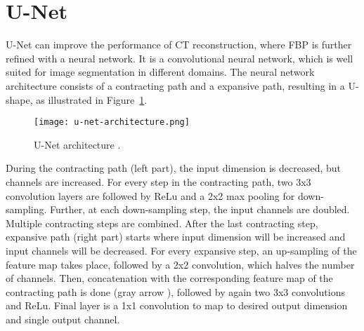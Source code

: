 \section{U-Net}
\label{sec:unet}
U-Net can improve the performance of CT reconstruction, where FBP is further refined with a neural network.
It is a convolutional neural network, which is well suited for image segmentation in different domains.
The neural network architecture consists of a contracting path and a expansive path,
resulting in a U-shape, as illustrated in Figure~\ref{fig:u-net-architectue}.

\begin{figure}[H]
  \centering
  \texttt{[image: u-net-architecture.png]}
  \caption{U-Net architecture \cite[p 2, Fig. 1]{unet-tomography}.}
    \label{fig:u-net-architectue}
\end{figure}


During the contracting path (left part), the input dimension is decreased, but channels are increased.
For every step in the contracting path, two 3x3 convolution layers are followed by ReLu
and a 2x2 max pooling for down-sampling. Further, at each down-sampling step, the input channels are doubled.
Multiple contracting steps are combined. After the last contracting step, expansive path (right part) starts
where input dimension will be increased and input channels will be decreased.
For every expansive step, an up-sampling of the feature map takes place, followed by a 2x2 convolution, 
which halves the number of channels. Then, concatenation with the corresponding feature
map of the contracting path is done (gray arrow ), followed by again two 3x3 convolutions and ReLu.
Final layer is a 1x1 convolution to map to desired output dimension and single output channel.

